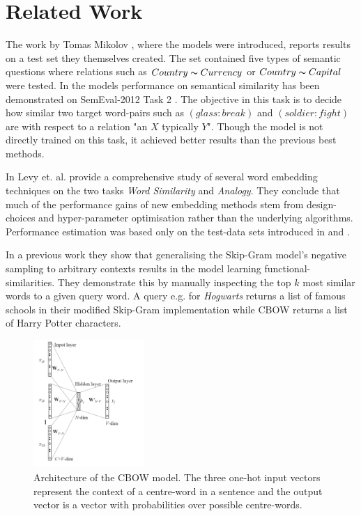\documentclass[conference]{IEEEtran}
\begin{document}
\section{Related Work}
\label{sec:relwork}

The work by Tomas Mikolov \cite{mikolov2013efficient}, where the models were introduced,
reports results on a test set they themselves created. The set contained five types of semantic
questions where relations such as $Country \thicksim Currency$ or $Country \thicksim Capital$
were tested. In \cite{mikolov2013linguistic} the models performance on semantical
similarity has been demonstrated on SemEval-2012 Task 2 \cite{jurgens2012semeval}.
The objective in this task is to decide how similar two target word-pairs such as
$(glass:break)$ and $(soldier:fight)$ are with respect to a relation "an $X$ typically $Y$". 
Though the model is not directly trained on this task, it achieved better results than  the previous
best methods. 

In \cite{levy2015improving} Levy et. al. provide a comprehensive study of several word 
embedding techniques on the two tasks \textit{Word Similarity} and \textit{Analogy}. 
They conclude that much of the performance gains of new embedding
methods stem from design-choices and hyper-parameter optimisation rather than the 
underlying algorithms. Performance estimation was based only on the test-data sets 
introduced in \cite{mikolov2013efficient} and \cite{mikolov2013linguistic}.

In a previous work \cite{levy2014dependency} they show that generalising the Skip-Gram 
model's negative sampling to arbitrary contexts results in the model learning 
functional-similarities. They demonstrate this by manually inspecting the top $k$ most 
similar words to a given query word. A query e.g. for \textit{Hogwarts} returns
a list of famous schools in their modified Skip-Gram implementation while CBOW returns 
a list of Harry Potter characters.

\begin{figure}[t]
\centering
\includegraphics[width=0.375\textwidth]{cbow}
\caption{Architecture of the CBOW model. The three one-hot input vectors represent the context 
of a centre-word in a sentence and the output vector is a vector with probabilities over possible 
centre-words. }
\label{fig:cbow}
\end{figure}
\end{document}

